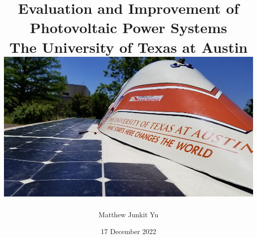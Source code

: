 \documentclass[12pt]{report}
\begin{document}
\title {
    {Evaluation and Improvement of Photovoltaic Power Systems}\\
    {\large The University of Texas at Austin}\\
    {\includegraphics[width=\textwidth]{lonestar_cover.jpg}}
}
\author{Matthew Junkit Yu}
\date{17 December 2022}
\maketitle

{
    \hypersetup{linkcolor=black}
    \tableofcontents
    \listoffigures
    \listoftables
}






{
    \hypersetup{linkcolor=black}
    \printbibliography[heading=bibintoc]
    \begin{appendices}
        
        
        
        
    \end{appendices}
    \listoftodos[TODOS]
}
\end{document}
